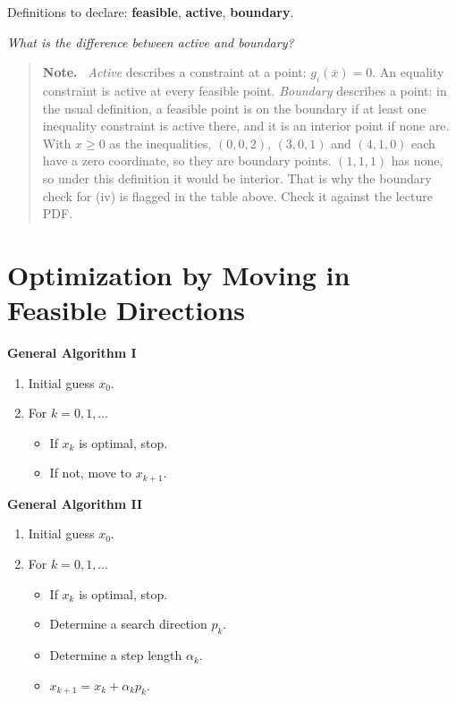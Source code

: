 \documentclass[11pt]{article}
\newenvironment{aside}{\begin{quote}\small\color{black!65}\textbf{Note.}\ }{\end{quote}}
\begin{document}
Definitions to declare: \textbf{feasible}, \textbf{active}, \textbf{boundary}.

\emph{What is the difference between active and boundary?}

\begin{aside}
\emph{Active} describes a constraint at a point: $g_i(\bar{x}) = 0$. An equality
constraint is active at every feasible point. \emph{Boundary} describes a point: in
the usual definition, a feasible point is on the boundary if at least one
inequality constraint is active there, and it is an interior point if none are.
With $x \ge 0$ as the inequalities, $(0,0,2)$, $(3,0,1)$ and $(4,1,0)$ each have a
zero coordinate, so they are boundary points. $(1,1,1)$ has none, so under this
definition it would be interior. That is why the boundary check for (iv) is
flagged in the table above. Check it against the lecture PDF.
\end{aside}

\section{Optimization by Moving in Feasible Directions}

\begin{minipage}[t]{0.47\linewidth}
\textbf{General Algorithm I}
\begin{enumerate}
    \item Initial guess $x_0$.
    \item For $k = 0, 1, \ldots$
    \begin{itemize}
        \item If $x_k$ is optimal, stop.
        \item If not, move to $x_{k+1}$.
    \end{itemize}
\end{enumerate}
\end{minipage}\hfill
\begin{minipage}[t]{0.47\linewidth}
\textbf{General Algorithm II}
\begin{enumerate}
    \item Initial guess $x_0$.
    \item For $k = 0, 1, \ldots$
    \begin{itemize}
        \item If $x_k$ is optimal, stop.
        \item Determine a search direction $p_k$.
        \item Determine a step length $\alpha_k$.
        \item $x_{k+1} = x_k + \alpha_k p_k$.
    \end{itemize}
\end{enumerate}
\end{minipage}
\end{document}
